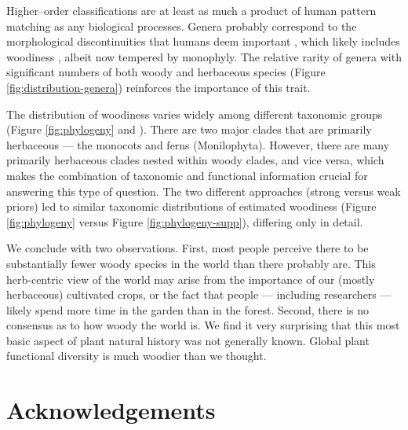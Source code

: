 \documentclass[a4paper,12pt]{article}
\begin{document}
%
Higher--order classifications are at least as much a product of human
pattern matching as any biological processes.  Genera probably
correspond to the morphological discontinuities that humans deem
important \citep{scotland2004significance}, which likely includes
woodiness \citep[e.g.,][]{Hutchinson}, albeit now tempered by
monophyly.  The relative rarity of genera with significant numbers of
both woody and herbaceous species (Figure
\ref{fig:distribution-genera}) reinforces the importance of this
trait.

The distribution of woodiness varies widely among different taxonomic
groups (Figure \ref{fig:phylogeny} and 
\citealt{sinnott1915evolution}).  There are two major clades that are
primarily herbaceous --- the monocots and ferns
(Monilophyta). However, there are many primarily herbaceous clades
nested within woody clades, and vice versa, which makes the
combination of taxonomic and functional information crucial for
answering this type of question.  The two different approaches (strong
versus weak priors) led to similar taxonomic distributions of
estimated woodiness (Figure \ref{fig:phylogeny} versus Figure
\ref{fig:phylogeny-supp}), differing only in detail.

We conclude with two observations.
%
First, most people perceive there to be substantially fewer woody
species in the world than there probably are.  This herb-centric view
of the world may arise from the importance of our (mostly herbaceous)
cultivated crops, or the fact that people --- including researchers
--- likely spend more time in the garden than in the forest.
%
Second, there is no consensus as to how woody the world is.  We find
it very surprising that this most basic aspect of plant natural
history was not generally known.  Global plant functional diversity is
much woodier than we thought.

\section{Acknowledgements}
\end{document}
